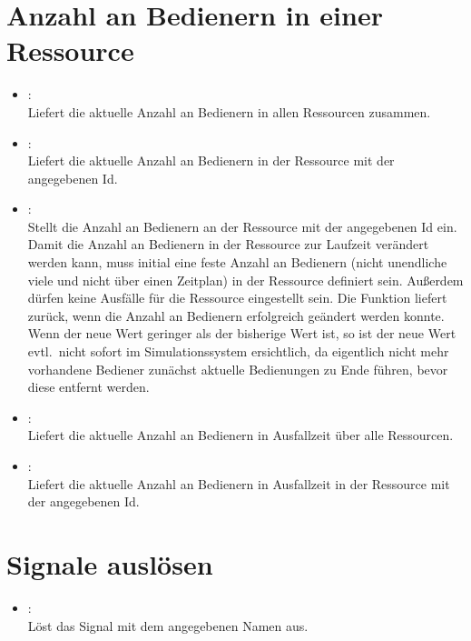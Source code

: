 \section{Anzahl an Bedienern in einer Ressource}

\begin{itemize}

\item
{}:\\
Liefert die aktuelle Anzahl an Bedienern in allen Ressourcen zusammen.
  
\item
{}:\\
Liefert die aktuelle Anzahl an Bedienern in der Ressource mit der angegebenen Id.
  
\item
{}:\\
Stellt die Anzahl an Bedienern an der Ressource mit der angegebenen Id ein.
Damit die Anzahl an Bedienern in der Ressource zur Laufzeit verändert werden kann,
muss initial eine feste Anzahl an Bedienern (nicht unendliche viele und nicht über einen Zeitplan)
in der Ressource definiert sein. Außerdem dürfen keine Ausfälle für die Ressource eingestellt sein.
Die Funktion liefert  zurück, wenn die Anzahl an Bedienern erfolgreich geändert
werden konnte. Wenn der neue Wert geringer als der bisherige Wert ist, so ist der neue Wert
evtl.\ nicht sofort im Simulationssystem ersichtlich, da eigentlich nicht mehr vorhandene Bediener
zunächst aktuelle Bedienungen zu Ende führen, bevor diese entfernt werden.

\item
{}:\\
Liefert die aktuelle Anzahl an Bedienern in Ausfallzeit über alle Ressourcen.

\item
{}:\\
Liefert die aktuelle Anzahl an Bedienern in Ausfallzeit in der Ressource mit der angegebenen Id.

\end{itemize}

\section{Signale auslösen}

\begin{itemize}

\item
{}:\\
Löst das Signal mit dem angegebenen Namen aus.

\end{itemize}



